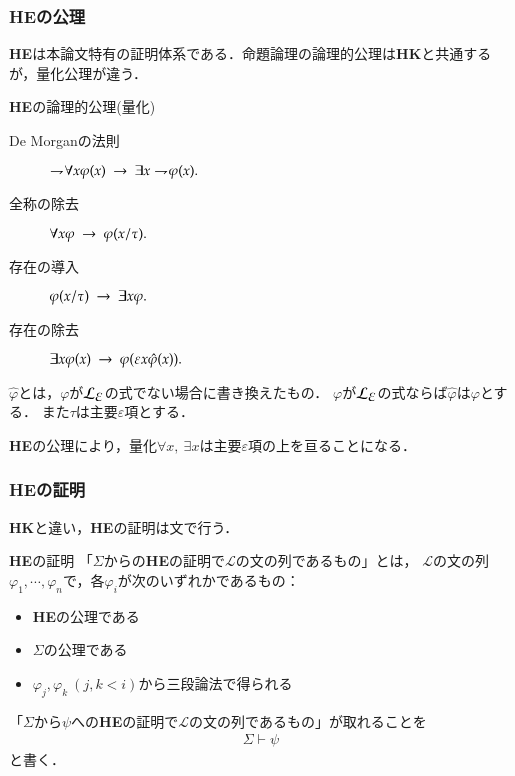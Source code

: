 \documentclass[dvipdfmx,10pt,notheorems]{beamer}
\theoremstyle{definition}
\newcommand{\lang}[1]{\mathcal{L}_{\scalebox{1.2}{$#1$}}} %
\newcommand{\negation}{\rightharpoondown\hspace{-0.25em}} %
\newcommand{\rarrow}{\hspace{0.25em}\rightarrow\hspace{0.25em}} %
\begin{document}
\begin{frame}\frametitle{{\bf HE}の公理}
	{\bf HE}は本論文特有の証明体系である．命題論理の論理的公理は{\bf HK}と共通するが，量化公理が違う．
	
	\begin{alertblock}{{\bf HE}の論理的公理(量化)}
		\begin{description}
			\item[De Morganの法則] $\negation \forall x \varphi(x) \rarrow \exists x \negation \varphi(x).$
				
			\item[全称の除去] $\forall x \varphi \rarrow \varphi(x/\tau).$
				
			\item[存在の導入] $\varphi(x/\tau) \rarrow \exists x \varphi.$
				
			\item[存在の除去] $\exists x \varphi(x) \rarrow \varphi(\varepsilon x \hat{\varphi}(x)).$
		\end{description}
		$\hat{\varphi}$とは，$\varphi$が$\lang{\varepsilon}$の式でない場合に書き換えたもの．
		$\varphi$が$\lang{\varepsilon}$の式ならば$\hat{\varphi}$は$\varphi$とする．
		また$\tau$は主要$\varepsilon$項とする．
	\end{alertblock}
	
	{\bf HE}の公理により，量化$\forall x,\ \exists x$は主要$\varepsilon$項の上を亘ることになる．
\end{frame}

\begin{frame}\frametitle{{\bf HE}の証明}
	{\bf HK}と違い，{\bf HE}の証明は文で行う．
	
	\begin{exampleblock}{{\bf HE}の証明}
		「$\Sigma$からの{\bf HE}の証明で$\mathcal{L}$の文の列であるもの」とは，
		$\mathcal{L}$の文の列$\varphi_{1},\cdots,\varphi_{n}$で，各$\varphi_{i}$が次のいずれかであるもの：
		\begin{itemize}
			\item {\bf HE}の公理である
			\item $\Sigma$の公理である
			\item $\varphi_{j},\varphi_{k}\ (j,k < i)$から三段論法で得られる
		\end{itemize}
	\end{exampleblock}
	
	「$\Sigma$から$\psi$への{\bf HE}の証明で$\mathcal{L}$の文の列であるもの」が取れることを
	\begin{align}
		\Sigma \vdash \psi
	\end{align}
	と書く．
\end{frame}
\end{document}
